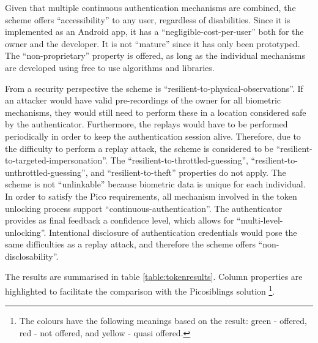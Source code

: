 Given that multiple continuous authentication mechanisms are combined, the scheme offers ``accessibility'' to any user, regardless of disabilities. Since it is implemented as an Android app, it has a ``negligible-cost-per-user'' both for the owner and the developer. It is not ``mature'' since it has only been prototyped. The ``non-proprietary'' property is offered, as long as the individual mechanisms are developed using free to use algorithms and libraries.

From a security perspective the scheme is ``resilient-to-physical-observations''. If an attacker would have valid pre-recordings of the owner for all biometric mechanisms, they would still need to perform these in a location considered safe by the authenticator. Furthermore, the replays would have to be performed periodically in order to keep the authentication session alive. Therefore, due to the difficulty to perform a replay attack, the scheme is considered to be ``resilient-to-targeted-impersonation''. The ``resilient-to-throttled-guessing'', ``resilient-to-unthrottled-guessing'', and ``resilient-to-theft'' properties do not apply. The scheme is not ``unlinkable'' because biometric data is unique for each individual. In order to satisfy the Pico requirements, all mechanism involved in the token unlocking process support ``continuous-authentication''. The authenticator provides as final feedback a confidence level, which allows for ``multi-level-unlocking''. Intentional disclosure of authentication credentials would pose the same difficulties as a replay attack, and therefore the scheme offers ``non-disclosability''.

The results are summarised in table \ref{table:tokenresults}. Column properties are highlighted to facilitate the comparison with the Picosiblings solution \footnote{The colours have the following meanings based on the result: green - offered, red - not offered, and yellow - quasi offered.}.

